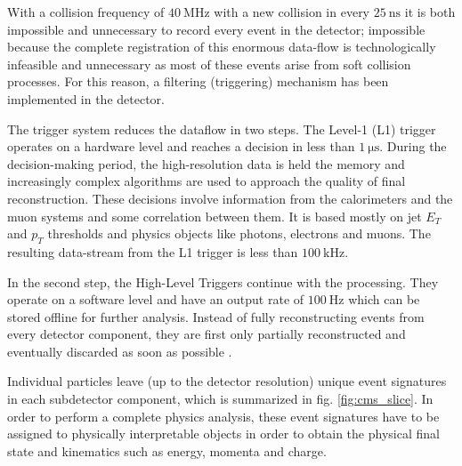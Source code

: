 
With a collision frequency of $\SI{40}{\mega\hertz}$ with a new collision in every $\SI{25}{\nano\second}$ it is both impossible and unnecessary to record every event in the detector; impossible because the complete registration of this enormous data-flow is technologically infeasible and unnecessary as most of these events arise from soft collision processes. For this reason, a filtering (triggering) mechanism has been implemented in the detector.

The trigger system reduces the dataflow in two steps. The Level-1 (L1) trigger operates on a hardware level and reaches a decision in less than $\SI{1}{\micro\second}$. During the decision-making period, the high-resolution data is held the memory and increasingly complex algorithms are used to approach the quality of final reconstruction. These decisions involve information from the calorimeters and the muon systems and some correlation between them. It is based mostly on jet $E_T$ and $p_T$ thresholds and physics objects like photons, electrons and muons. The resulting data-stream from the L1 trigger is less than $\SI{100}{\kilo\hertz}$.

In the second step, the High-Level Triggers continue with the processing. They operate on a software level and have an output rate of $\SI{100}{\hertz}$ which can be stored offline for further analysis. Instead of fully reconstructing events from every detector component, they are first only partially reconstructed and eventually discarded as soon as possible \cite{Bayatian:922757}.


Individual particles leave (up to the detector resolution) unique event signatures in each subdetector component, which is summarized in fig. \ref{fig:cms_slice}. In order to perform a complete physics analysis, these event signatures have to be assigned to physically interpretable objects in order to obtain the physical final state and kinematics such as energy, momenta and charge.

